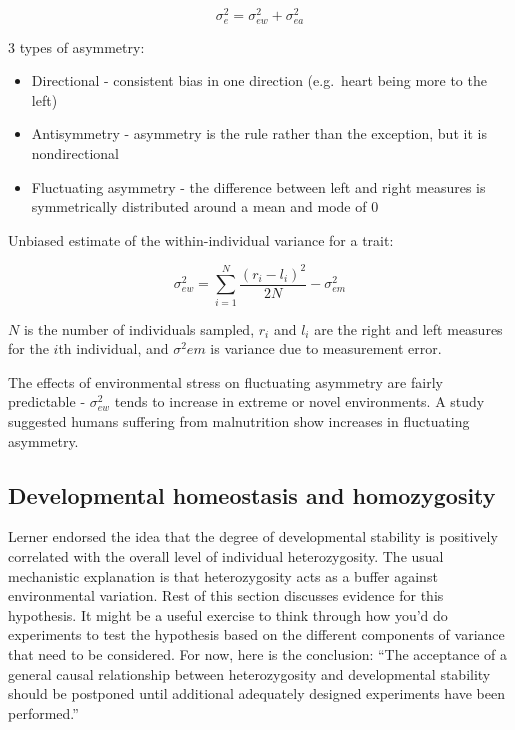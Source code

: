 \documentclass[
]{book}
\providecommand{\tightlist}{%
  \setlength{\itemsep}{0pt}\setlength{\parskip}{0pt}}
\begin{document}
\begin{equation}
  \sigma^2_{e} = \sigma^2_{ew} + \sigma^2_{ea}
  \label{eq:special-environmental-effects-variance}
\end{equation}

3 types of asymmetry:

\begin{itemize}
\tightlist
\item
  Directional - consistent bias in one direction (e.g.~heart being more to the left)
\item
  Antisymmetry - asymmetry is the rule rather than the exception, but it is nondirectional
\item
  Fluctuating asymmetry - the difference between left and right measures is symmetrically distributed around a mean and mode of 0
\end{itemize}

Unbiased estimate of the within-individual variance for a trait:

\begin{equation}
  \sigma^2_{ew} = \sum_{i=1}^{N} \frac{(r_i - l_i)^2}{2N} - \sigma^2_{em}
  \label{eq:within-individual-variance}
\end{equation}

\(N\) is the number of individuals sampled, \(r_i\) and \(l_i\) are the right and left measures for the \(i\)th individual, and \(\sigma^2{em}\) is variance due to measurement error.

The effects of environmental stress on fluctuating asymmetry are fairly predictable - \(\sigma^2_{ew}\) tends to increase in extreme or novel environments. A study suggested humans suffering from malnutrition show increases in fluctuating asymmetry.

\hypertarget{developmental-homeostasis-and-homozygosity}{%
\subsection{Developmental homeostasis and homozygosity}\label{developmental-homeostasis-and-homozygosity}}

Lerner endorsed the idea that the degree of developmental stability is positively correlated with the overall level of individual heterozygosity. The usual mechanistic explanation is that heterozygosity acts as a buffer against environmental variation. Rest of this section discusses evidence for this hypothesis. It might be a useful exercise to think through how you'd do experiments to test the hypothesis based on the different components of variance that need to be considered. For now, here is the conclusion: ``The acceptance of a general causal relationship between heterozygosity and developmental stability should be postponed until additional adequately designed experiments have been performed.''
\end{document}
